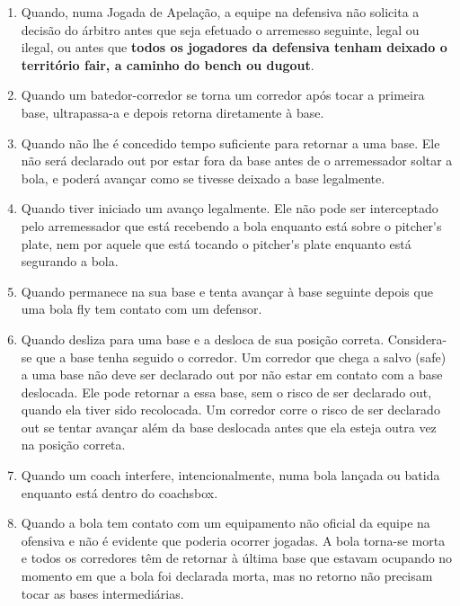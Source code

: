 \begin{multicols}{2}
\begin{enumerate}[label=\alph*)]
\begin{enumerate}[label = \arabic*)]
			\item com a m\~ao, enquanto segura a bola com a luva, ou com a luva, enquanto a bola est\'a na outra m\~ao. 
		\end{enumerate}	
		\item  Quando, numa Jogada de Apela\c{c}\~ao, a equipe na defensiva n\~ao solicita a decis\~ao do \'arbitro antes que seja efetuado o arremesso seguinte, legal ou ilegal, ou antes que\textbf{ todos os jogadores da defensiva tenham deixado o territ\'orio \gls{fair}, a caminho do \gls{bench} ou \Gls{dugout}}. 
		
		\item  Quando um batedor-corredor se torna um corredor ap\'os tocar a primeira base, ultrapassa-a e depois retorna diretamente \`a base. 
		
		\item  Quando n\~ao lhe \'e concedido tempo suficiente para retornar a uma base. Ele n\~ao ser\'a declarado \gls{out} por estar fora da base antes de o arremessador soltar a bola, e poder\'a avan\c{c}ar como se tivesse deixado a base legalmente. 
		
		\item  Quando tiver iniciado um avan\c{c}o legalmente. Ele n\~ao pode ser interceptado pelo arremessador que est\'a recebendo a bola enquanto est\'a sobre o \gls{pitcher's plate}, nem por aquele que est\'a tocando o \gls{pitcher's plate} enquanto est\'a segurando a bola. 
		
		\item  Quando permanece na sua base e tenta avan\c{c}ar \`a base seguinte depois que uma bola \gls{fly} tem contato com um defensor. 
		
		\item  Quando desliza para uma base e a desloca de sua posi\c{c}\~ao correta. Considera-se que a base tenha seguido o corredor. Um corredor que chega a salvo (\gls{safe}) a uma base n\~ao deve ser declarado \gls{out} por n\~ao estar em contato com a base deslocada. Ele pode retornar a essa base, sem o risco de ser declarado \gls{out}, quando ela tiver sido recolocada. Um corredor corre o risco de ser declarado \gls{out} se tentar avan\c{c}ar al\'em da base deslocada antes que ela esteja outra vez na posi\c{c}\~ao correta. 
		
		\item  Quando um \gls{coach} interfere, intencionalmente, numa bola lan\c{c}ada ou batida enquanto est\'a dentro do \gls{coachsbox}.
		
		\item Quando a bola tem contato com um equipamento n\~ao oficial da equipe na ofensiva e n\~ao \'e evidente que poderia ocorrer jogadas. A bola torna-se morta e todos os corredores t\^em de retornar \`a \'ultima base que estavam ocupando no momento em que a bola foi declarada morta, mas no retorno n\~ao precisam tocar as bases intermedi\'arias. 
		
	\end{enumerate}
\end{multicols}

